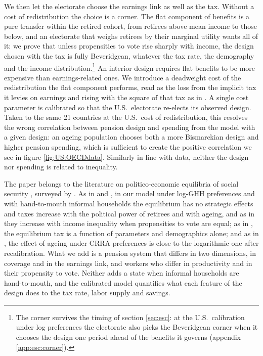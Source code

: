 We then let the electorate choose the earnings link as well as the tax. Without a cost of redistribution the choice is a corner. The flat component of benefits is a pure transfer within the retired cohort, from retirees above mean income to those below, and an electorate that weighs retirees by their marginal utility wants all of it: we prove that unless propensities to vote rise sharply with income, the design chosen with the tax is fully Beveridgean, whatever the tax rate, the demography and the income distribution.\footnote{The corner survives the timing of section \ref{sec:esc}: at the U.S.\ calibration under log preferences the electorate also picks the Beveridgean corner when it chooses the design one period ahead of the benefits it governs (appendix \ref{app:esc:corner}).} An interior design requires flat benefits to be more expensive than earnings-related ones. We introduce a deadweight cost of the redistribution the flat component performs, read as the loss from the implicit tax it levies on earnings \parencite{Summers89a1} and rising with the square of that tax as in \textcite{Harberger64a1}. A single cost parameter is calibrated so that the U.S.\ electorate re-elects its observed design. Taken to the same 21 countries at the U.S.\ cost of redistribution, this resolves the wrong correlation between pension design and spending from the model with a given design: an ageing population chooses both a more Bismarckian design and higher pension spending, which is sufficient to create the positive correlation we see in figure \ref{fig:US:OECDdata}. Similarly in line with data, neither the design nor spending is related to inequality. 


The paper belongs to the literature on politico-economic equilibria of social security \parencite[e.g.][]{CooleyS99a1,Galasso99a1,Forni05a1,mkvss08,Song12a1}, surveyed by \textcite{GalassoP02a1}. As in \textcite{mkvss08} and \textcite{Song12a1}, in our model under log-GHH preferences and with hand-to-mouth informal households the equilibrium has no strategic effects and taxes increase with the political power of retirees and with ageing, and as in \textcite{Song12a1} they increase with income inequality when propensities to vote are equal; as in \textcite{UchidaOa1}, the equilibrium tax is a function of parameters and demographics alone; and as in \textcite{mkvss05}, the effect of ageing under CRRA preferences is close to the logarithmic one after recalibration. What we add is a pension system that differs in two dimensions, in coverage and in the earnings link, and workers who differ in productivity and in their propensity to vote. Neither adds a state when informal households are hand-to-mouth, and the calibrated model quantifies what each feature of the design does to the tax rate, labor supply and savings.

